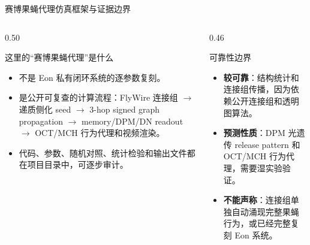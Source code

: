 \documentclass[aspectratio=169,10pt,fontset=none]{ctexbeamer}
\newcommand{\orange}[1]{\textcolor{FlyOrange}{\textbf{#1}}}
\newcommand{\red}[1]{\textcolor{FlyRed}{\textbf{#1}}}
\begin{document}
\begin{frame}{赛博果蝇代理仿真框架与证据边界}
\small
\begin{columns}[T,onlytextwidth]
  \begin{column}{0.50\textwidth}
    \begin{block}{这里的“赛博果蝇代理”是什么}
      \begin{itemize}
        \item 不是 Eon 私有闭环系统的逐参数复刻。
        \item 是公开可复查的计算流程：FlyWire 连接组 $\rightarrow$ 递质侧化 seed $\rightarrow$ 3-hop signed graph propagation $\rightarrow$ memory/DPM/DN readout $\rightarrow$ OCT/MCH 行为代理和视频渲染。
        \item 代码、参数、随机对照、统计检验和输出文件都在项目目录中，可逐步审计。
      \end{itemize}
    \end{block}
  \end{column}
  \begin{column}{0.46\textwidth}
    \begin{block}{可靠性边界}
      \begin{itemize}
        \item \orange{较可靠}：结构统计和连接组传播，因为依赖公开连接组和透明图算法。
        \item \orange{预测性质}：DPM 光遗传 release pattern 和 OCT/MCH 行为代理，需要湿实验验证。
        \item \red{不能声称}：连接组单独自动涌现完整果蝇行为，或已经完整复刻 Eon 系统。
      \end{itemize}
    \end{block}
  \end{column}
\end{columns}
\end{frame}
\end{document}
